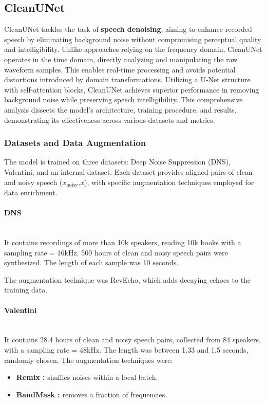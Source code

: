 \subsection{CleanUNet \cite{kong2022}}
CleanUNet tackles the task of \textbf{speech denoising}, aiming to enhance recorded speech by eliminating background noise without compromising perceptual quality and intelligibility. Unlike approaches relying on the frequency domain, CleanUNet operates in the time domain, directly analyzing and manipulating the raw waveform samples. This enables real-time processing and avoids potential distortions introduced by domain transformations. Utilizing a U-Net structure with self-attention blocks, CleanUNet achieves superior performance in removing background noise while preserving speech intelligibility. This comprehensive analysis dissects the model's architecture, training procedure, and results, demonstrating its effectiveness across various datasets and metrics.

\subsubsection{Datasets and Data Augmentation}
The model is trained on three datasets: Deep Noise Suppression (DNS), Valentini, and an internal dataset. Each dataset provides aligned pairs of clean and noisy speech ($x_{\text{noisy}}$,$x$), with specific augmentation techniques employed for data enrichment. 

\paragraph{DNS}\mbox{}\\
It contains recordings of more than 10k speakers, reading 10k books with a sampling rate = 16kHz. 500 hours of clean and noisy speech pairs were synthesized. The length of each sample was 10 seconds.

The augmentation technique was RevEcho, which adds decaying echoes to the training data.

\paragraph{Valentini}\mbox{}\\
It contains 28.4 hours of clean and noisy speech pairs, collected from 84 speakers, with a sampling rate = 48kHz. The length was between 1.33 and 1.5 seconds, randomly chosen. The augmentation techniques were: 
\begin{itemize}
    \item \textbf{Remix :} shuffles noises within a local batch.
    \item \textbf{BandMask :} removes a fraction of frequencies.
\end{itemize}

